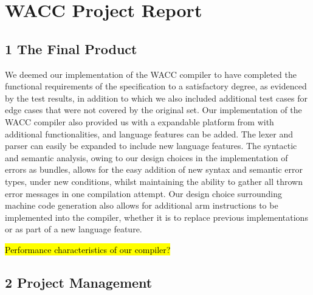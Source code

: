 \documentclass[10pt,a4paper]{report}
\begin{document}
  \section*{WACC Project Report}


  \subsection*{1 The Final Product}
  We deemed our implementation of the WACC compiler to have completed the
  functional requirements of the specification to a satisfactory degree, as
  evidenced by the test results, in addition to which we also included
  additional test cases for edge cases that were not covered by the original set.
  Our implementation of the WACC compiler also provided us with a expandable
  platform from with additional functionalities, and language features can be
  added. The lexer and parser can easily be expanded to include new language
  features. The syntactic and semantic analysis, owing to our design choices in
  the implementation of errors as bundles, allows for the easy addition of new
  syntax and semantic error types, under new conditions, whilst maintaining the
  ability to gather all thrown error messages in one compilation attempt.
  Our design choice surrounding machine code generation also allows for
  additional arm instructions to be implemented into the compiler, whether it is
  to replace previous implementations or as part of a new language feature.

  \hl{Performance characteristics of our compiler?}


  \subsection*{2 Project Management}
\end{document}
